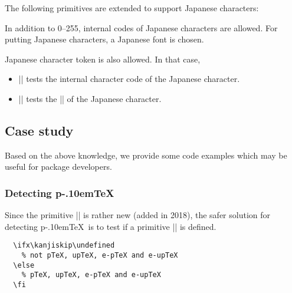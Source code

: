 \documentclass[a4paper,11pt]{article}
\def\pTeX{p\kern-.10em\TeX}
\begin{document}
The following primitives are extended to support Japanese characters:
\begin{cslist}
 \csitem[\.{char} <character code>,
   \.{chardef} <control sequence>=<character code>]
  In addition to 0--255, internal codes of Japanese characters are allowed.
  For putting Japanese characters, a Japanese font is chosen.


 \csitem[\.{accent} <character code>=<character>]

  Japanese character token is also allowed.
  In that case,
  \begin{itemize}
    \item |\if| tests the internal character code of the Japanese character.
    \item |\ifcat| tests the |\kcatcode| of the Japanese character.
  \end{itemize}
\end{cslist}


\subsection{Case study}

Based on the above knowledge, we provide some code examples
which may be useful for package developers.

\subsubsection{Detecting \pTeX}

Since the primitive |\ptexversion| is rather new (added in 2018),
the safer solution for detecting \pTeX\ is
to test if a primitive |\kanjiskip| is defined.
\begin{verbatim}
  \ifx\kanjiskip\undefined
    % not pTeX, upTeX, e-pTeX and e-upTeX
  \else
    % pTeX, upTeX, e-pTeX and e-upTeX
  \fi
\end{verbatim}
\end{document}
